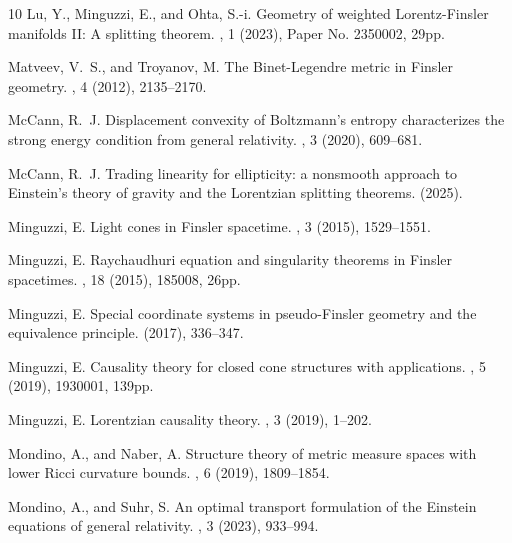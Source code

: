 \documentclass[a4paper,11pt]{article}
\numberwithin{equation}{section}
\theoremstyle{definition}
\theoremstyle{plain}
\begin{document}
\begin{thebibliography}{10}
	{\sc Lu, Y., Minguzzi, E., and Ohta, S.-i.}
	\newblock Geometry of weighted {L}orentz-{F}insler manifolds {II}: {A}
	splitting theorem.
	, 1 (2023), Paper No. 2350002, 29pp.
	
	{\sc Matveev, V.~S., and Troyanov, M.}
	\newblock The {B}inet-{L}egendre metric in {F}insler geometry.
	, 4 (2012), 2135--2170.
	
	{\sc McCann, R.~J.}
	\newblock Displacement convexity of {B}oltzmann's entropy characterizes the
	strong energy condition from general relativity.
	, 3 (2020), 609--681.
	
	{\sc McCann, R.~J.}
	\newblock Trading linearity for ellipticity: a nonsmooth approach to {E}instein's
	theory of gravity and the {L}orentzian splitting theorems.
	 (2025).
	
	{\sc Minguzzi, E.}
	\newblock Light cones in {F}insler spacetime.
	, 3 (2015), 1529--1551.
	
	{\sc Minguzzi, E.}
	\newblock Raychaudhuri equation and singularity theorems in {F}insler
	spacetimes.
	, 18 (2015), 185008, 26pp.
	
	{\sc Minguzzi, E.}
	\newblock Special coordinate systems in pseudo-{F}insler geometry and the
	equivalence principle.
	 (2017), 336--347.
	
	{\sc Minguzzi, E.}
	\newblock Causality theory for closed cone structures with applications.
	, 5 (2019), 1930001, 139pp.
	
	{\sc Minguzzi, E.}
	\newblock Lorentzian causality theory.
	, 3 (2019), 1--202.
	
	{\sc Mondino, A., and Naber, A.}
	\newblock Structure theory of metric measure spaces with lower {R}icci
	curvature bounds.
	, 6 (2019), 1809--1854.
	
	{\sc Mondino, A., and Suhr, S.}
	\newblock An optimal transport formulation of the {E}instein equations of
	general relativity.
	, 3 (2023), 933--994.
	

\end{thebibliography}
\end{document}
